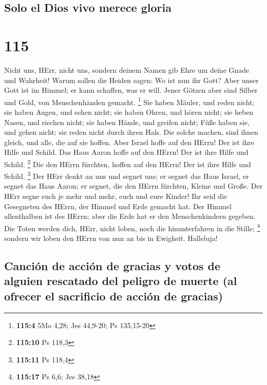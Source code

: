 \hypertarget{solo-el-dios-vivo-merece-gloria}{%
\subsection{Solo el Dios vivo merece
gloria}\label{solo-el-dios-vivo-merece-gloria}}

\hypertarget{section-114}{%
\section{115}\label{section-114}}

 Nicht uns, HErr, nicht uns, sondern deinem Namen gib Ehre
um deine Gnade und Wahrheit!  Warum sollen die Heiden
sagen: Wo ist nun ihr Gott?  Aber unser Gott ist im
Himmel; er kann schaffen, was er will.  Jener Götzen aber
sind Silber und Gold, von Menschenhänden gemacht. \footnote{\textbf{115:4}
  5Mo 4,28; Jes 44,9-20; Ps 135,15-20}  Sie haben Mäuler,
und reden nicht; sie haben Augen, und sehen nicht;  sie
haben Ohren, und hören nicht; sie heben Nasen, und riechen nicht;
 sie haben Hände, und greifen nicht; Füße haben sie, und
gehen nicht; sie reden nicht durch ihren Hals.  Die solche
machen, sind ihnen gleich, und alle, die auf sie hoffen. 
Aber Israel hoffe auf den HErrn! Der ist ihre Hilfe und Schild.
 Das Haus Aaron hoffe auf den HErrn! Der ist ihre Hilfe
und Schild. \footnote{\textbf{115:10} Ps 118,3}  Die den
HErrn fürchten, hoffen auf den HErrn! Der ist ihre Hilfe und Schild.
\footnote{\textbf{115:11} Ps 118,4}  Der HErr denkt an
uns und segnet uns; er segnet das Haus Israel, er segnet das Haus Aaron;
 er segnet, die den HErrn fürchten, Kleine und Große.
 Der HErr segne euch je mehr und mehr, euch und eure
Kinder!  Ihr seid die Gesegneten des HErrn, der Himmel
und Erde gemacht hat.  Der Himmel allenthalben ist des
HErrn; aber die Erde hat er den Menschenkindern gegeben. 
Die Toten werden dich, HErr, nicht loben, noch die hinunterfahren in die
Stille; \footnote{\textbf{115:17} Ps 6,6; Jes 38,18} 
sondern wir loben den HErrn von nun an bis in Ewigkeit. Halleluja!

\hypertarget{canciuxf3n-de-acciuxf3n-de-gracias-y-votos-de-alguien-rescatado-del-peligro-de-muerte-al-ofrecer-el-sacrificio-de-acciuxf3n-de-gracias}{%
\subsection{Canción de acción de gracias y votos de alguien rescatado
del peligro de muerte (al ofrecer el sacrificio de acción de
gracias)}\label{canciuxf3n-de-acciuxf3n-de-gracias-y-votos-de-alguien-rescatado-del-peligro-de-muerte-al-ofrecer-el-sacrificio-de-acciuxf3n-de-gracias}}

